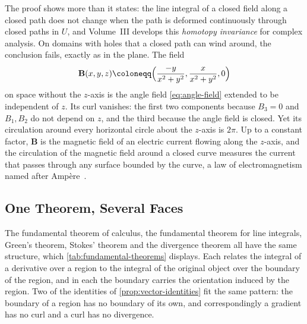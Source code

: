 The proof shows more than it states: the line integral of a closed field along a closed path does not change when the path is deformed continuously through closed paths in $U$, and Volume~III develops this \emph{homotopy invariance} for complex analysis. On domains with holes that a closed path can wind around, the conclusion fails, exactly as in the plane. The field
\[
\mathbf B(x,y,z)\coloneqq\Bigl(\frac{-y}{x^2+y^2},\frac x{x^2+y^2},0\Bigr)
\]
on space without the $z$-axis is the angle field \eqref{eq:angle-field} extended to be independent of $z$. Its curl vanishes: the first two components because $B_3=0$ and $B_1,B_2$ do not depend on $z$, and the third because the angle field is closed. Yet its circulation around every horizontal circle about the $z$-axis is $2\pi$. Up to a constant factor, $\mathbf B$ is the magnetic field of an electric current flowing along the $z$-axis, and the circulation of the magnetic field around a closed curve measures the current that passes through any surface bounded by the curve, a law of electromagnetism named after Amp\`ere~\cite{marsden2012vector}.

\subsection{One Theorem, Several Faces}

The fundamental theorem of calculus, the fundamental theorem for line integrals, Green's theorem, Stokes' theorem and the divergence theorem all have the same structure, which \cref{tab:fundamental-theorems} displays. Each relates the integral of a derivative over a region to the integral of the original object over the boundary of the region, and in each the boundary carries the orientation induced by the region. Two of the identities of \cref{prop:vector-identities} fit the same pattern: the boundary of a region has no boundary of its own, and correspondingly a gradient has no curl and a curl has no divergence.

